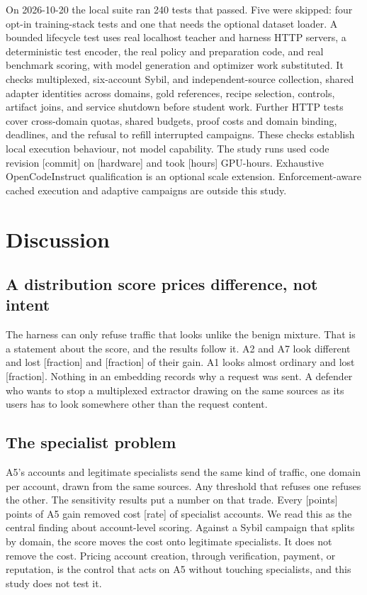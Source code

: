 \documentclass[journal]{IEEEtran}
\newcommand{\tbd}[1]{\textcolor{red!65!black}{[#1]}}
\begin{document}
On 2026-10-20 the local suite ran 240 tests that passed. Five were skipped: four opt-in training-stack tests and one that needs the optional dataset loader. A bounded lifecycle test uses real localhost teacher and harness HTTP servers, a deterministic test encoder, the real policy and preparation code, and real benchmark scoring, with model generation and optimizer work substituted. It checks multiplexed, six-account Sybil, and independent-source collection, shared adapter identities across domains, gold references, recipe selection, controls, artifact joins, and service shutdown before student work. Further HTTP tests cover cross-domain quotas, shared budgets, proof costs and domain binding, deadlines, and the refusal to refill interrupted campaigns. These checks establish local execution behaviour, not model capability. The study runs used code revision \tbd{commit} on \tbd{hardware} and took \tbd{hours} GPU-hours. Exhaustive OpenCodeInstruct qualification is an optional scale extension. Enforcement-aware cached execution and adaptive campaigns are outside this study.

\section{Discussion}
\label{sec:discussion}
\subsection{A distribution score prices difference, not intent}
The harness can only refuse traffic that looks unlike the benign mixture. That is a statement about the score, and the results follow it. A2 and A7 look different and lost \tbd{fraction} and \tbd{fraction} of their gain. A1 looks almost ordinary and lost \tbd{fraction}. Nothing in an embedding records why a request was sent. A defender who wants to stop a multiplexed extractor drawing on the same sources as its users has to look somewhere other than the request content.

\subsection{The specialist problem}
A5's accounts and legitimate specialists send the same kind of traffic, one domain per account, drawn from the same sources. Any threshold that refuses one refuses the other. The sensitivity results put a number on that trade. Every \tbd{points} points of A5 gain removed cost \tbd{rate} of specialist accounts. We read this as the central finding about account-level scoring. Against a Sybil campaign that splits by domain, the score moves the cost onto legitimate specialists. It does not remove the cost. Pricing account creation, through verification, payment, or reputation, is the control that acts on A5 without touching specialists, and this study does not test it.
\end{document}
